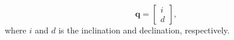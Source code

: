  \begin{equation}
   \mathbf{q} =
   \left[ \begin{array}{c}
   i  \\ 
   d     
   \end{array} \right] ,
   \label{eq:q_vector}
 \end{equation}
 where $i$ and $d$ is the inclination and declination, respectively.





  












